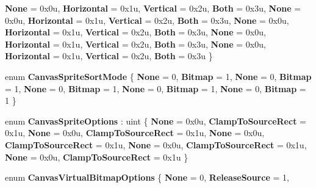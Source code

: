 \begin{DoxyCompactItemize}
{\bfseries None} = 0x0u, 
{\bfseries Horizontal} = 0x1u, 
{\bfseries Vertical} = 0x2u, 
{\bfseries Both} = 0x3u, 
\newline
{\bfseries None} = 0x0u, 
{\bfseries Horizontal} = 0x1u, 
{\bfseries Vertical} = 0x2u, 
{\bfseries Both} = 0x3u, 
\newline
{\bfseries None} = 0x0u, 
{\bfseries Horizontal} = 0x1u, 
{\bfseries Vertical} = 0x2u, 
{\bfseries Both} = 0x3u, 
\newline
{\bfseries None} = 0x0u, 
{\bfseries Horizontal} = 0x1u, 
{\bfseries Vertical} = 0x2u, 
{\bfseries Both} = 0x3u, 
\newline
{\bfseries None} = 0x0u, 
{\bfseries Horizontal} = 0x1u, 
{\bfseries Vertical} = 0x2u, 
{\bfseries Both} = 0x3u
 \}
\item 
\mbox{\label{namespace_microsoft_1_1_graphics_1_1_canvas_a78964f5963aadeacf020f306893b03c8}} 
enum {\bfseries Canvas\+Sprite\+Sort\+Mode} \{ \newline
{\bfseries None} = 0, 
{\bfseries Bitmap} = 1, 
{\bfseries None} = 0, 
{\bfseries Bitmap} = 1, 
\newline
{\bfseries None} = 0, 
{\bfseries Bitmap} = 1, 
{\bfseries None} = 0, 
{\bfseries Bitmap} = 1, 
\newline
{\bfseries None} = 0, 
{\bfseries Bitmap} = 1
 \}
\item 
\mbox{\label{namespace_microsoft_1_1_graphics_1_1_canvas_ab6862b1a93938e7824d0fff2e6892380}} 
enum {\bfseries Canvas\+Sprite\+Options} \+: uint \{ \newline
{\bfseries None} = 0x0u, 
{\bfseries Clamp\+To\+Source\+Rect} = 0x1u, 
{\bfseries None} = 0x0u, 
{\bfseries Clamp\+To\+Source\+Rect} = 0x1u, 
\newline
{\bfseries None} = 0x0u, 
{\bfseries Clamp\+To\+Source\+Rect} = 0x1u, 
{\bfseries None} = 0x0u, 
{\bfseries Clamp\+To\+Source\+Rect} = 0x1u, 
\newline
{\bfseries None} = 0x0u, 
{\bfseries Clamp\+To\+Source\+Rect} = 0x1u
 \}
\item 
\mbox{\label{namespace_microsoft_1_1_graphics_1_1_canvas_a1a98137e8da81a9cc6c342d3aadbd14b}} 
enum {\bfseries Canvas\+Virtual\+Bitmap\+Options} \{ \newline
{\bfseries None} = 0, 
{\bfseries Release\+Source} = 1, 

\end{DoxyCompactItemize}
